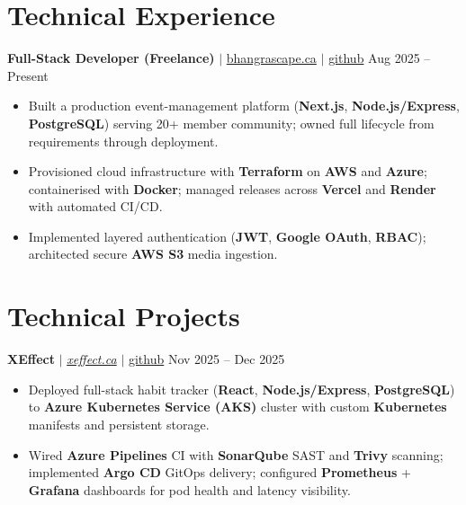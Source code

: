 \documentclass[11pt,a4paper]{article}
\begin{document}
\section{Technical Experience}

\textbf{Full-Stack Developer (Freelance)} $|$ \href{https://bhangrascape.ca}{bhangrascape.ca} $|$ \href{https://github.com/bhat0155/bhangraescape}{\small github} \hfill Aug 2025 -- Present
\begin{itemize}
    \item Built a production event-management platform (\textbf{Next.js}, \textbf{Node.js/Express}, \textbf{PostgreSQL}) serving 20+ member community; owned full lifecycle from requirements through deployment.
    \item Provisioned cloud infrastructure with \textbf{Terraform} on \textbf{AWS} and \textbf{Azure}; containerised with \textbf{Docker}; managed releases across \textbf{Vercel} and \textbf{Render} with automated CI/CD.
    \item Implemented layered authentication (\textbf{JWT}, \textbf{Google OAuth}, \textbf{RBAC}); architected secure \textbf{AWS S3} media ingestion.
\end{itemize}

\section{Technical Projects}

\textbf{XEffect} $|$ \href{https://www.xeffect.ca/app}{\emph{xeffect.ca}} $|$ \href{https://github.com/bhat0155/xeffect}{\small github} \hfill Nov 2025 -- Dec 2025
\begin{itemize}
    \item Deployed full-stack habit tracker (\textbf{React}, \textbf{Node.js/Express}, \textbf{PostgreSQL}) to \textbf{Azure Kubernetes Service (AKS)} cluster with custom \textbf{Kubernetes} manifests and persistent storage.
    \item Wired \textbf{Azure Pipelines} CI with \textbf{SonarQube} SAST and \textbf{Trivy} scanning; implemented \textbf{Argo CD} GitOps delivery; configured \textbf{Prometheus} + \textbf{Grafana} dashboards for pod health and latency visibility.
\end{itemize}

\vspace{4pt}
\end{document}
